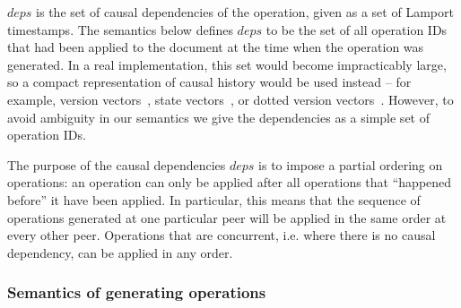 \documentclass[a4paper,twocolumn,10pt]{article}
\begin{document}
$\mathit{deps}$ is the set of causal dependencies of the operation, given as a set of Lamport timestamps. The semantics below defines $\mathit{deps}$ to be the set of all operation IDs that had been applied to the document at the time when the operation was generated. In a real implementation, this set would become impracticably large, so a compact representation of causal history would be used instead -- for example, version vectors~\cite{ParkerJr:1983jb}, state vectors~\cite{Ellis:1989ue}, or dotted version vectors~\cite{Preguica:2012fx}. However, to avoid ambiguity in our semantics we give the dependencies as a simple set of operation IDs.

The purpose of the causal dependencies $\mathit{deps}$ is to impose a partial ordering on operations: an operation can only be applied after all operations that ``happened before'' it have been applied. In particular, this means that the sequence of operations generated at one particular peer will be applied in the same order at every other peer. Operations that are concurrent, i.e. where there is no causal dependency, can be applied in any order.

\subsubsection{Semantics of generating operations}
\end{document}
